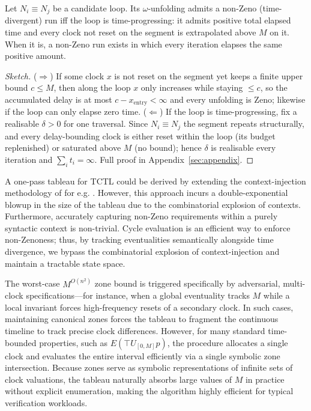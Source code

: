 \begin{lemma}\label{lem:nonzeno}
Let $N_i\equiv N_j$ be a candidate loop. Its $\omega$-unfolding admits a non-Zeno (time-divergent) run iff the loop is {time-progressing}: it admits positive total elapsed time {and} every clock not reset on the segment is extrapolated above $M$ on it. When it is, a non-Zeno run exists in which every iteration elapses the same positive amount.
\end{lemma}
\begin{proof}[Sketch]
($\Rightarrow$) If some clock $x$ is not reset on the segment yet keeps a finite upper bound $c\le M$, then along the loop $x$ only increases while staying $\le c$, so the accumulated delay is at most $c-x_{\text{entry}}<\infty$ and every unfolding is Zeno; likewise if the loop can only elapse zero time. ($\Leftarrow$) If the loop is time-progressing, fix a realisable $\delta>0$ for one traversal. Since $N_i\equiv N_j$ the segment repeats structurally, and every delay-bounding clock is either reset within the loop (its budget replenished) or saturated above $M$ (no bound); hence $\delta$ is realisable every iteration and $\sum_i t_i=\infty$. Full proof in Appendix~\ref{sec:appendix}.
\end{proof}



\begin{remark}
    A one-pass tableau for TCTL could be derived by extending the context-injection methodology of for e.g. \cite{tableau_ctl}. However, this approach incurs a double-exponential blowup in the size of the tableau due to the combinatorial explosion of contexts. Furthermore, accurately capturing non-Zeno requirements within a purely syntactic context is non-trivial. Cycle evaluation is an efficient way to enforce non-Zenoness; thus, by tracking eventualities semantically alongside time divergence, we bypass the combinatorial explosion of context-injection and maintain a tractable state space.

\end{remark}


\begin{remark} The worst-case $M^{O(n^2)}$ zone bound is triggered specifically by adversarial, multi-clock specifications—for instance, when a global eventuality tracks $M$ while a local invariant forces high-frequency resets of a secondary clock. In such cases, maintaining canonical zones forces the tableau to fragment the continuous timeline to track precise clock differences. However, for many standard time-bounded properties, such as $E(\top U_{[0, M]} p)$, the procedure allocates a single clock and evaluates the entire interval efficiently via a single symbolic zone intersection. Because zones serve as symbolic representations of infinite sets of clock valuations, the tableau naturally absorbs large values of $M$ in practice without explicit enumeration, making the algorithm highly efficient for typical verification workloads.

\end{remark}




